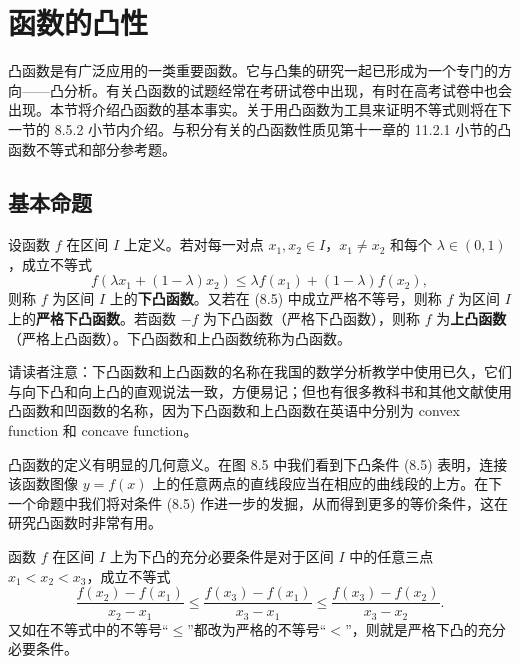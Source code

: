 \section{函数的凸性}

凸函数是有广泛应用的一类重要函数。它与凸集的研究一起已形成为一个专门的方向——凸分析。有关凸函数的试题经常在考研试卷中出现，有时在高考试卷中也会出现。本节将介绍凸函数的基本事实。关于用凸函数为工具来证明不等式则将在下一节的 8.5.2 小节内介绍。与积分有关的凸函数性质见第十一章的 11.2.1 小节的凸函数不等式和部分参考题。

\subsection{基本命题}

\begin{xdefinition}
设函数 $f$ 在区间 $I$ 上定义。若对每一对点 $x_1,x_2\in I$，$x_1\ne x_2$ 和每个 $\lambda\in(0,1)$，成立不等式
\begin{equation}
  f(\lambda x_1+(1-\lambda)x_2)\le\lambda f(x_1)+(1-\lambda)f(x_2),
  \tag{8.5}
  \label{eq:8.5}
\end{equation}
则称 $f$ 为区间 $I$ 上的\textbf{下凸函数}。又若在 (8.5) 中成立严格不等号，则称 $f$ 为区间 $I$ 上的\textbf{严格下凸函数}。若函数 $-f$ 为下凸函数（严格下凸函数），则称 $f$ 为\textbf{上凸函数}（严格上凸函数）。下凸函数和上凸函数统称为凸函数。
\end{xdefinition}

\begin{xremark}
请读者注意：下凸函数和上凸函数的名称在我国的数学分析教学中使用已久，它们与向下凸和向上凸的直观说法一致，方便易记；但也有很多教科书和其他文献使用凸函数和凹函数的名称，因为下凸函数和上凸函数在英语中分别为 convex function 和 concave function。
\end{xremark}

凸函数的定义有明显的几何意义。在图 8.5 中我们看到下凸条件 (8.5) 表明，连接该函数图像 $y=f(x)$ 上的任意两点的直线段应当在相应的曲线段的上方。在下一个命题中我们将对条件 (8.5) 作进一步的发掘，从而得到更多的等价条件，这在研究凸函数时非常有用。

\begin{xtheorem}[8.4.1]
函数 $f$ 在区间 $I$ 上为下凸的充分必要条件是对于区间 $I$ 中的任意三点 $x_1<x_2<x_3$，成立不等式
\begin{equation}
  \frac{f(x_2)-f(x_1)}{x_2-x_1}
  \le\frac{f(x_3)-f(x_1)}{x_3-x_1}
  \le\frac{f(x_3)-f(x_2)}{x_3-x_2}.
  \tag{8.6}
  \label{eq:8.6}
\end{equation}
又如在不等式中的不等号“$\le$”都改为严格的不等号“$<$”，则就是严格下凸的充分必要条件。
\end{xtheorem}


